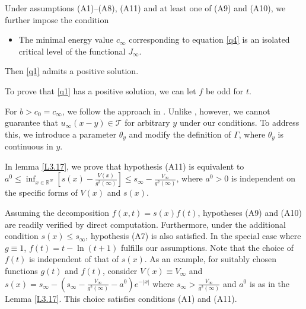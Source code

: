\documentclass[reqno]{amsart}
\begin{document}
\begin{theorem}\label{thm1.1}
Under assumptions {\rm (A1)--(A8), (A11)}   and at least one of {\rm (A9)} and {\rm (A10)},
we further impose the condition
\begin{itemize} %
\item[(A12)] The minimal energy value $c_{\infty}$ corresponding to equation \eqref{q4} is an isolated critical level of the functional $J_{\infty}$.
\end{itemize}
Then \eqref{q1} admits a positive solution. 
\end{theorem}

\begin{remark}\label{r1} \rm
To prove that \eqref{q1} has a positive solution, we  can let  $f$ be odd for $t$.
\end{remark}

\begin{remark}\label{r2} \rm
For \( b > c_0=c_\infty \), we follow the approach in \cite{Ambrosetti}. 
Unlike \cite{Ambrosetti}, however, we cannot guarantee that \( u_\infty(x - y) \in \mathcal{T} \) 
for arbitrary \( y \) under our conditions. To address this, we introduce a parameter \( \theta_y \) 
and modify the definition of \( \Gamma \), where \( \theta_y \) is continuous in \( y \).
\end{remark}

\begin{remark}\label{r3} \rm
In lemma \ref{L3.17}, we prove that hypothesis (A11) is equivalent to 
$a^0\leq\inf _{x\in{\mathbb{R}^N}}[s(x)-\frac{V(x)}{g^2(\infty)}]\leq s_{\infty}-\frac{V_{\infty}}{g^2(\infty)}$, 
where $a^0>0$ is independent on the specific forms of $V(x)$ and $s(x)$.
\end{remark}

\begin{remark}\label{r4} \rm 
Assuming the decomposition $f(x,t)=s(x)f(t)$, hypotheses (A9) and (A10) are readily verified by 
direct computation. Furthermore, under the additional condition $s(x)\leq s_\infty$, 
hypothesis (A7) is also satisfied. In the special case where $g\equiv1$,  $f(t)=t-\ln(t+1)$ 
fulfills our assumptions. Note that the choice of $f(t)$ is independent of that of $s(x)$. 
As an example, for suitably chosen functions $g(t)$ and $f(t)$, consider  $V(x)\equiv V_\infty$ 
and $s(x)=s_\infty-(s_\infty-\frac{V_\infty}{g^2(\infty)}-a^0)e^{-|x|}$ 
where $s_\infty>\frac{V_\infty}{g^2(\infty)}$ and $a^0$ is as in the Lemma \ref{L3.17}. 
This choice satisfies conditions (A1) and (A11). 
\end{remark}
\end{document}
